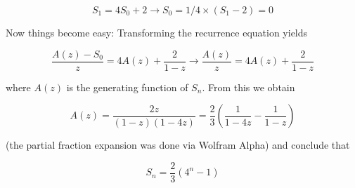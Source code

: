 \[ S_1 = 4 S_0 + 2 \rightarrow S_0 = 1/4 \times (S_1-2) = 0 \]

Now things become easy: Transforming the recurrence equation yields

\[\frac{A(z)-S_0}{z} = 4A(z) + \frac{2}{1-z} \rightarrow \frac{A(z)}{z} = 4A(z) + \frac{2}{1-z} \]

where $A(z)$ is the generating function of $S_n$. From this we obtain

\[ A(z) =  \frac{2z}{(1-z)(1-4z)} = \frac{2}{3} \left( \frac{1}{1-4z} - \frac{1}{1-z} \right)\]

(the partial fraction expansion was done via Wolfram Alpha) and conclude
that

\[ S_n = \frac{2}{3} \left(4^n - 1\right) \]
